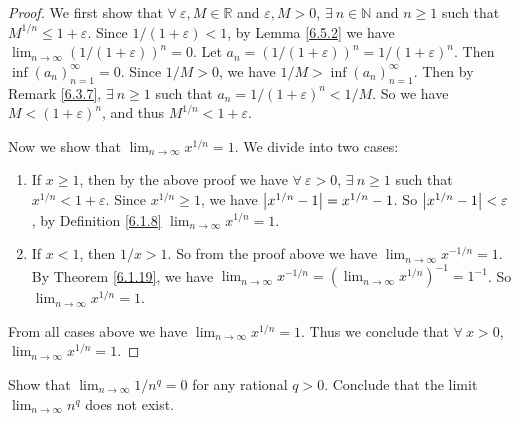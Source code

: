 \begin{proof}
We first show that \(\forall\ \varepsilon, M \in \mathds{R}\) and \(\varepsilon, M > 0\), \(\exists\ n \in \mathds{N}\) and \(n \geq 1\) such that \(M^{1 / n} \leq 1 + \varepsilon\).
Since \(1 / (1 + \varepsilon) < 1\), by Lemma \ref{6.5.2} we have \(\lim_{n \to \infty} (1 / (1 + \varepsilon))^n = 0\).
Let \(a_n = (1 / (1 + \varepsilon))^n = 1 / (1 + \varepsilon)^n\).
Then \(\inf(a_n)_{n = 1}^\infty = 0\).
Since \(1 / M > 0\), we have \(1 / M > \inf(a_n)_{n = 1}^\infty\).
Then by Remark \ref{6.3.7}, \(\exists\ n \geq 1\) such that \(a_n = 1 / (1 + \varepsilon)^n < 1 / M\).
So we have \(M < (1 + \varepsilon)^n\), and thus \(M^{1 / n} < 1 + \varepsilon\).

Now we show that \(\lim_{n \to \infty} x^{1 / n} = 1\).
We divide into two cases:
\begin{enumerate}
    \item If \(x \geq 1\), then by the above proof we have \(\forall\ \varepsilon > 0\), \(\exists\ n \geq 1\) such that \(x^{1 / n} < 1 + \varepsilon\).
    Since \(x^{1 / n} \geq 1\), we have \(\abs*{x^{1 / n} - 1} = x^{1 / n} - 1\).
    So \(\abs*{x^{1 / n} - 1} < \varepsilon\), by Definition \ref{6.1.8} \(\lim_{n \to \infty} x^{1 / n} = 1\).
    \item If \(x < 1\), then \(1 / x > 1\).
    So from the proof above we have \(\lim_{n \to \infty} x^{-1 / n} = 1\).
    By Theorem \ref{6.1.19}, we have \(\lim_{n \to \infty} x^{-1 / n} = (\lim_{n \to \infty} x^{1 / n})^{-1} = 1^{-1}\).
    So \(\lim_{n \to \infty} x^{1 / n} = 1\).
\end{enumerate}
From all cases above we have \(\lim_{n \to \infty} x^{1 / n} = 1\).
Thus we conclude that \(\forall\ x > 0\), \(\lim_{n \to \infty} x^{1 / n} = 1\).
\end{proof}

\exercisesection

\begin{exercise}\label{ex 6.5.1}
Show that \(\lim_{n \to \infty} 1 / n^q = 0\) for any rational \(q > 0\).
Conclude that the limit \(\lim_{n \to \infty} n^q\) does not exist.
\end{exercise}

